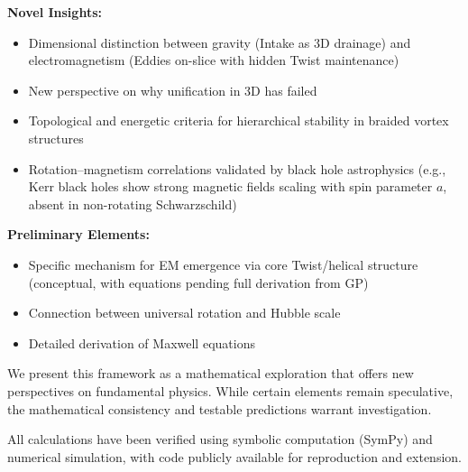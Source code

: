 \textbf{Novel Insights:}
\begin{itemize}
\item Dimensional distinction between gravity (Intake as 3D drainage) and electromagnetism (Eddies on-slice with hidden Twist maintenance)
\item New perspective on why unification in 3D has failed
\item Topological and energetic criteria for hierarchical stability in braided vortex structures
\item Rotation–magnetism correlations validated by black hole astrophysics (e.g., Kerr black holes show strong magnetic fields scaling with spin parameter $a$, absent in non-rotating Schwarzschild)
\end{itemize}

\textbf{Preliminary Elements:}
\begin{itemize}
\item Specific mechanism for EM emergence via core Twist/helical structure (conceptual, with equations pending full derivation from GP)
\item Connection between universal rotation and Hubble scale
\item Detailed derivation of Maxwell equations
\end{itemize}

We present this framework as a mathematical exploration that offers new perspectives on fundamental physics. While certain elements remain speculative, the mathematical consistency and testable predictions warrant investigation.

All calculations have been verified using symbolic computation (SymPy) and numerical simulation, with code publicly available for reproduction and extension.

